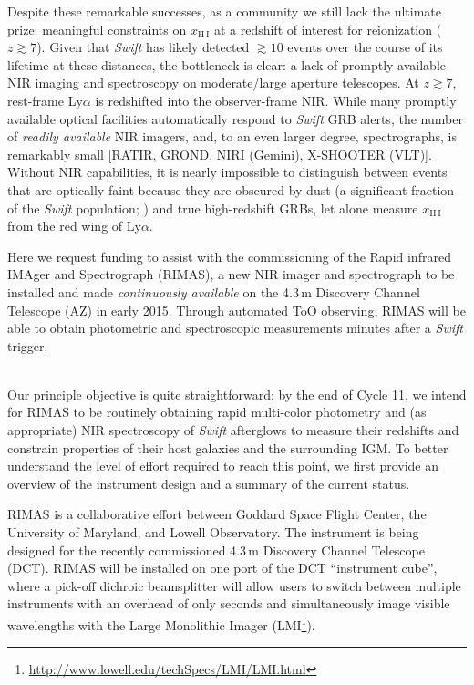 \documentclass[letterpaper,11pt]{article}
\begin{document}
Despite these remarkable successes, as a community we still lack the ultimate
prize: meaningful constraints on $x_{\mathrm{H\,I}}$ at a redshift of interest
for reionization ($z \gtrsim 7$).  Given that \textit{Swift} has likely detected
$\gtrsim 10$ events over the course of its lifetime at these distances, the
bottleneck is clear: a lack of promptly available NIR imaging and spectroscopy 
on moderate/large aperture telescopes.  At $z \gtrsim 7$, rest-frame Ly$\alpha$
is redshifted into the observer-frame NIR.  While many promptly available 
optical facilities automatically respond to \textit{Swift} GRB alerts, the number
of \textit{readily available} NIR imagers, and, to an even larger degree,
spectrographs, is remarkably small [RATIR, GROND, NIRI (Gemini), X-SHOOTER (VLT)].
Without NIR capabilities, it is nearly impossible to distinguish between events
that are optically faint because they are obscured by dust (a significant fraction
of the \textit{Swift} population; \cite{ckh+09,pcb+09,gkk+11}) and true
high-redshift GRBs, let alone measure $x_{\mathrm{H\,I}}$ from the red wing of
Ly$\alpha$.

Here we request funding to assist with the commissioning of the Rapid infrared
IMAger and Spectrograph (RIMAS), a new NIR imager and spectrograph to be installed and made
\textit{continuously available} on the 4.3\,m Discovery Channel Telescope (AZ) in early 2015.
Through automated ToO observing, RIMAS will be able to obtain photometric and spectroscopic
measurements minutes after a \textit{Swift} trigger.\\

\smallskip

\smallskip\\
Our principle objective is quite straightforward: by the end of Cycle 11, we intend
for RIMAS to be routinely obtaining rapid multi-color photometry and (as appropriate) 
NIR spectroscopy of \textit{Swift} afterglows to measure their redshifts and constrain 
properties of their host galaxies and the surrounding IGM.  To better understand the 
level of effort required to reach this point, we first provide an overview of the 
instrument design and a summary of the current status.

\smallskip

RIMAS is a collaborative effort between Goddard Space Flight Center, the University of
Maryland, and Lowell Observatory.  The instrument is being designed for the recently
commissioned 4.3\,m Discovery Channel Telescope (DCT).  RIMAS will be installed on one 
port of the DCT ``instrument cube'', where a pick-off dichroic beamsplitter will allow users to
switch between multiple instruments with an overhead of only seconds and simultaneously
image visible wavelengths with the Large Monolithic Imager 
(LMI\footnote{\url{http://www.lowell.edu/techSpecs/LMI/LMI.html}}).
\end{document}
